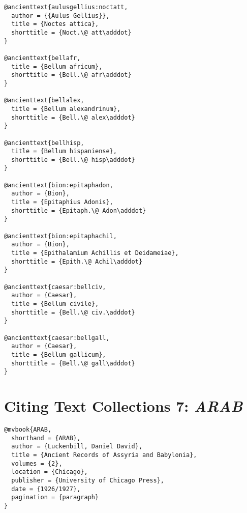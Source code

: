 \documentclass[a4paper]{article}
\renewcommand\footnote[1]{##1}%
\begin{document}
\begin{verbatim}
@ancienttext{aulusgellius:noctatt,
  author = {{Aulus Gellius}},
  title = {Noctes attica},
  shorttitle = {Noct.\@ att\adddot}
}

@ancienttext{bellafr,
  title = {Bellum africum},
  shorttitle = {Bell.\@ afr\adddot}
}

@ancienttext{bellalex,
  title = {Bellum alexandrinum},
  shorttitle = {Bell.\@ alex\adddot}
}

@ancienttext{bellhisp,
  title = {Bellum hispaniense},
  shorttitle = {Bell.\@ hisp\adddot}
}

@ancienttext{bion:epitaphadon,
  author = {Bion},
  title = {Epitaphius Adonis},
  shorttitle = {Epitaph.\@ Adon\adddot}
}

@ancienttext{bion:epitaphachil,
  author = {Bion},
  title = {Epithalamium Achillis et Deidameiae},
  shorttitle = {Epith.\@ Achil\adddot}
}

@ancienttext{caesar:bellciv,
  author = {Caesar},
  title = {Bellum civile},
  shorttitle = {Bell.\@ civ.\adddot}
}

@ancienttext{caesar:bellgall,
  author = {Caesar},
  title = {Bellum gallicum},
  shorttitle = {Bell.\@ gall\adddot}
}
\end{verbatim}

\begin{verbcite}
  \nocite{aulusgellius:noctatt, bellafr, bellalex, bellhisp, bion:epitaphadon,
    bion:epitaphachil, caesar:bellciv, caesar:bellgall}
\end{verbcite}
\exampleabbreviations
{}

\section{Citing Text Collections 7: \emph{ARAB}}

\begin{verbatim}
@mvbook{ARAB,
  shorthand = {ARAB},
  author = {Luckenbill, Daniel David},
  title = {Ancient Records of Assyria and Babylonia},
  volumes = {2},
  location = {Chicago},
  publisher = {University of Chicago Press},
  date = {1926/1927},
  pagination = {paragraph}
}
\end{verbatim}

\exampleabbreviations
{}
\end{document}

